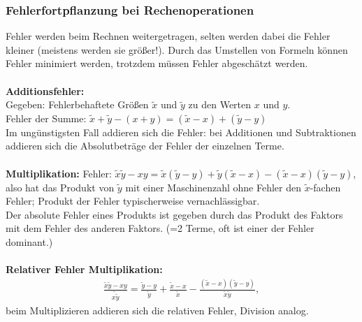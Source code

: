 \documentclass{scrartcl}
\begin{document}
\subsubsection{Fehlerfortpflanzung bei Rechenoperationen}
Fehler werden beim Rechnen weitergetragen, selten werden dabei die Fehler kleiner (meistens werden sie größer!).
Durch das Umstellen von Formeln können Fehler minimiert werden, trotzdem müssen Fehler abgeschätzt werden. \\
\\
\textbf{Additionsfehler:}\\
Gegeben: Fehlerbehaftete Größen $\tilde{x}$ und $\tilde{y}$ zu den Werten $x$ und $y$.\\
Fehler der Summe: $\tilde{x}+\tilde{y}-(x+y)=(\tilde{x}-x)+(\tilde{y}-y)$\\
Im ungünstigsten Fall addieren sich die Fehler: bei Additionen und Subtraktionen addieren sich die Absolutbeträge der Fehler der einzelnen Terme.\\
\\
\textbf{Multiplikation:}
Fehler: $\tilde{x} \tilde{y}- x y=\tilde{x}(\tilde{y}-y)+\tilde{y}(\tilde{x}-x)-(\tilde{x}-x)(\tilde{y}-y)$,
also hat das Produkt von $\tilde{y}$ mit einer Maschinenzahl ohne Fehler den $\tilde{x}$-fachen Fehler; Produkt der Fehler typischerweise vernachlässigbar.\\
Der absolute Fehler eines Produkts ist gegeben durch das Produkt des Faktors mit dem Fehler des anderen Faktors. (=2 Terme, oft ist einer der Fehler dominant.)\\
\\
\textbf{Relativer Fehler Multiplikation:}\\
\begin{align*}
\frac{\tilde{x} \tilde{y}- x y}{\tilde{x \tilde{y}}}=\frac{\tilde{y}-y}{\tilde{y}}+\frac{\tilde{x}-x}{\tilde{x}}-\frac{(\tilde{x}-x)(\tilde{y}-y)}{\tilde{x} \tilde{y}},
\end{align*} beim Multiplizieren addieren sich die relativen Fehler, Division analog.
\end{document}
